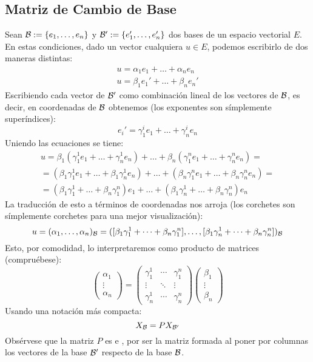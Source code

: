 \subsection{Matriz de Cambio de Base}
\label{A1_cambioBase}
Sean $\mathcal{B}:=\{e_1,\dots,e_n\}$ y $\mathcal{B}':=\{e_1',\dots,e_n'\}$ dos bases de un espacio vectorial $E$.
En estas condiciones, dado un vector cualquiera $u\in E$, podemos escribirlo de dos maneras distintas:
\begin{gather}
	u=\alpha_1e_1+\dots+\alpha_ne_n\\
	\label{A1_eq_escritura2}
	u=\beta_1e_1'+\dots+\beta_ne_n'
\end{gather}
Escribiendo cada vector de $\mathcal{B}'$ como combinación lineal de los vectores de $\mathcal{B}$, es decir, en coordenadas de $\mathcal{B}$ obtenemos (los exponentes son símplemente superíndices):
\begin{equation}
	e_i'=\gamma_1^ie_1+\dots+\gamma_n^ie_n
\end{equation}
Uniendo las ecuaciones se tiene:
\begin{multline}
	u=\beta_1(\gamma_1^1e_1+\dots+\gamma_n^1e_n)+\dots+\beta_n(\gamma_1^ne_1+\dots+\gamma_n^ne_n)=\\
	=(\beta_1\gamma_1^1e_1+\dots+\beta_1\gamma_n^1e_n)+\dots+(\beta_n\gamma_1^ne_1+\dots+\beta_n\gamma_n^ne_n)=\\
	=(\beta_1\gamma_1^1+\dots+\beta_n\gamma_1^n)e_1+\dots+(\beta_1\gamma_n^1+\dots+\beta_n\gamma_n^n)e_n
\end{multline}
La traducción de esto a términos de coordenadas nos arroja (los corchetes son símplemente corchetes para una mejor visualización):
\begin{equation}
	u=(\alpha_1,\dots,\alpha_n)_{\mathcal{B}}=([\beta_1\gamma_1^1+\dots+\beta_n\gamma_1^n],\dots,[\beta_1\gamma_n^1+\dots+\beta_n\gamma_n^n])_{\mathcal{B}}
\end{equation}
Esto, por comodidad, lo interpretaremos como producto de matrices (compruébese):
\begin{equation}
	\begin{pmatrix}
	\alpha_1\\
	\vdots\\
	\alpha_n
	\end{pmatrix}=
	\begin{pmatrix}
	\gamma_1^1 & \cdots & \gamma_1^n\\
	\vdots & \ddots & \vdots\\
	\gamma_n^1 & \cdots & \gamma_n^n
	\end{pmatrix}
	\begin{pmatrix}
	\beta_1\\
	\vdots\\
	\beta_n
	\end{pmatrix}
\end{equation}
Usando una notación más compacta:
\begin{equation}
	X_{\mathcal{B}}=PX_{\mathcal{B}'}
\end{equation}
Obsérvese que la matriz $P$ es  e , por ser la matriz formada al poner por columnas los vectores de la base $\mathcal{B}'$ respecto de la base $\mathcal{B}$.

